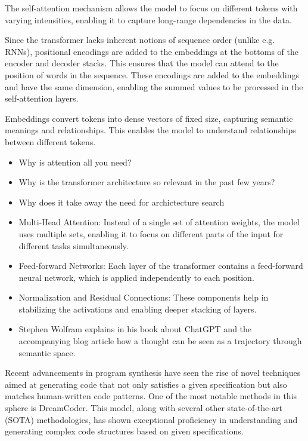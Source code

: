 The self-attention mechanism allows the model to focus on different tokens with varying intensities, enabling it to capture long-range dependencies in the data.

Since the transformer lacks inherent notions of sequence order (unlike e.g. RNNs), positional encodings are added to the embeddings at the bottoms of the encoder and decoder stacks. This ensures that the model can attend to the position of words in the sequence. These encodings are added to the embeddings and have the same dimension, enabling the summed values to be processed in the self-attention layers.

Embeddings convert tokens into dense vectors of fixed size, capturing semantic meanings and relationships. This enables the model to understand relationships between different tokens.

\begin{itemize}
    \item Why is attention all you need?
    \item Why is the transformer architecture so relevant in the past few years?
    \item Why does it take away the need for archictecture search
    \item Multi-Head Attention: Instead of a single set of attention weights, the model uses multiple sets, enabling it to focus on different parts of the input for different tasks simultaneously.
    \item Feed-forward Networks: Each layer of the transformer contains a feed-forward neural network, which is applied independently to each position.
    \item Normalization and Residual Connections: These components help in stabilizing the activations and enabling deeper stacking of layers.
    \item Stephen Wolfram explains in his book about ChatGPT and the accompanying blog article how a thought can be seen as a trajectory through semantic space. 
\end{itemize}








Recent advancements in program synthesis have seen the rise of novel techniques aimed at generating code that not only satisfies a given specification but also matches human-written code patterns. One of the most notable methods in this sphere is DreamCoder. This model, along with several other state-of-the-art (SOTA) methodologies, has shown exceptional proficiency in understanding and generating complex code structures based on given specifications.

